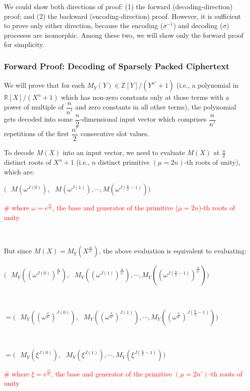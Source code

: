 We could show both directions of proof: (1) the forward (decoding-direction) proof; and (2) the backward (encoding-direction) proof. However, it is sufficient to prove only either direction, because the encoding ($\sigma^{-1}$) and decoding ($\sigma$) processes are isomorphic. Among these two, we will show only the forward proof for simplicity. 

\subsubsection{Forward Proof: Decoding of Sparsely Packed Ciphertext}

We will prove that for each $M_Y(Y) \in \mathbb{Z}[Y] / (Y^{n'} + 1)$ (i.e., a polynomial in $\mathbb{R}[X] / (X^n + 1)$ which has non-zero constants only at those terms with a power of multiple of $\dfrac{n}{n'}$ and zero constants in all other terms), the polynomial gets decoded into some $\dfrac{n}{2}$-dimensional input vector which comprises $\dfrac{n}{n'}$ repetitions of the first $\dfrac{n'}{2}$ consecutive slot values. 

To decode $M(X)$ into an input vector, we need to evaluate $M(X)$ at $\frac{n}{2}$ distinct roots of $X^n + 1$ (i.e., $n$ distinct primitive $(\mu=2n)$-th roots of unity), which are: 

$\bm{(} \text{ } 
M(\omega^{J(0)}), \text{ } M(\omega^{J(1)}), \cdots,  M(\omega^{J(\frac{n}{2}-1)})\bm{)}$ 

\textcolor{red}{ \# where $\omega=e^{\frac{i\pi}{n}}$, the base and generator of the primitive ($\mu=2n$)-th roots of unity}

$ $

But since $M(X) = M_Y(X^{\frac{n}{n'}})$, the above evaluation is equivalent to evaluating: 

$\bm{(} \text{ } 
M_Y((\omega^{J(0)})^{\frac{n}{n'}}), \text{ } M_Y((\omega^{J(1)})^{\frac{n}{n'}}), \cdots,  M_Y((\omega^{J(\frac{n}{2}-1)})^{\frac{n}{n'}}) \bm{)}$

$ $

$= \bm{(} \text{ } 
M_Y((\omega^{\frac{n}{n'}})^{J(0)}), \text{ } M_Y((\omega^{\frac{n}{n'}})^{J(1)}), \cdots,  M_Y((\omega^{\frac{n}{n'}})^{J(\frac{n}{2}-1)})\bm{)}$

$ $

$= \bm{(} \text{ } 
M_Y(\xi^{J(0)}), \text{ } M_Y(\xi^{J(1)}), \cdots,  M_Y(\xi^{J(\frac{n}{2}-1)})\bm{)}$ 

\textcolor{red}{ \# where $\xi = e^{\frac{i\pi}{n'}}$, the base and generator of the primitive $(\mu=2n')$-th roots of unity}

